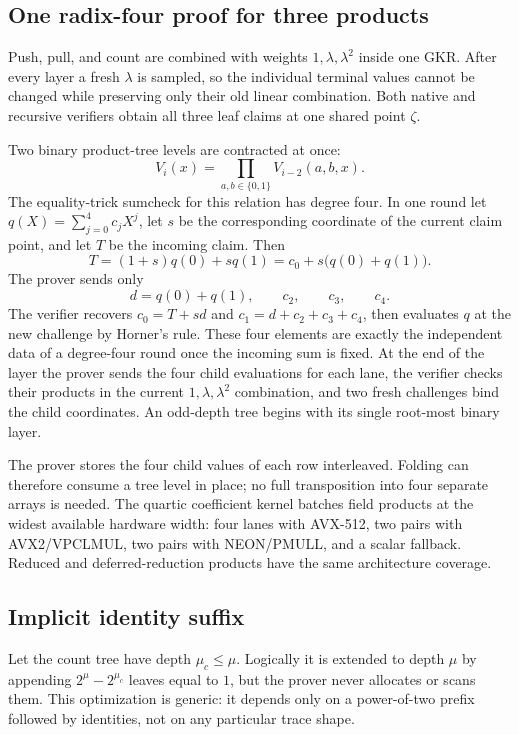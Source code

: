 \documentclass[11pt]{article}
\begin{document}
\subsection{One radix-four proof for three products}

Push, pull, and count are combined with weights $1,\lambda,\lambda^2$ inside one GKR. After every layer a fresh $\lambda$ is sampled, so the individual terminal values cannot be changed while preserving only their old linear combination. Both native and recursive verifiers obtain all three leaf claims at one shared point $\zeta$.

Two binary product-tree levels are contracted at once:
\[
V_i(x)=\prod_{a,b\in\{0,1\}}V_{i-2}(a,b,x).
\]
The equality-trick sumcheck for this relation has degree four. In one round let $q(X)=\sum_{j=0}^4c_jX^j$, let $s$ be the corresponding coordinate of the current claim point, and let $T$ be the incoming claim. Then
\[
T=(1+s)q(0)+sq(1)=c_0+s\bigl(q(0)+q(1)\bigr).
\]
The prover sends only
\[
d=q(0)+q(1),\qquad c_2,\qquad c_3,\qquad c_4.
\]
The verifier recovers $c_0=T+sd$ and $c_1=d+c_2+c_3+c_4$, then evaluates $q$ at the new challenge by Horner's rule. These four elements are exactly the independent data of a degree-four round once the incoming sum is fixed. At the end of the layer the prover sends the four child evaluations for each lane, the verifier checks their products in the current $1,\lambda,\lambda^2$ combination, and two fresh challenges bind the child coordinates. An odd-depth tree begins with its single root-most binary layer.

The prover stores the four child values of each row interleaved. Folding can therefore consume a tree level in place; no full transposition into four separate arrays is needed. The quartic coefficient kernel batches field products at the widest available hardware width: four lanes with AVX-512, two pairs with AVX2/VPCLMUL, two pairs with NEON/PMULL, and a scalar fallback. Reduced and deferred-reduction products have the same architecture coverage.

\subsection{Implicit identity suffix}

Let the count tree have depth $\mu_c\leq\mu$. Logically it is extended to depth $\mu$ by appending $2^\mu-2^{\mu_c}$ leaves equal to $1$, but the prover never allocates or scans them. This optimization is generic: it depends only on a power-of-two prefix followed by identities, not on any particular trace shape.
\end{document}

